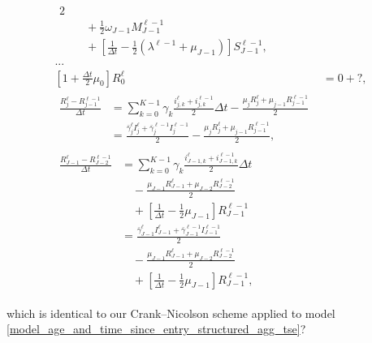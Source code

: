 \documentclass{jpmarticle}
\let\subequationsorig\subequations%
\let\endsubequationsorig\endsubequations%
\renewenvironment{subequations}{
  \subequationsorig
  \renewcommand{\theequation}{\theparentequation.\arabic{equation}}
}{
  \endsubequationsorig
}
\begin{document}
\begin{subequations}
\begin{align}
\begin{split}
      {2}
      \\ & \quad {}
      + \frac{1}{2} \omega_{J - 1} M_{J - 1}^{\ell - 1}
      \\ & \quad {}
      + \left[\frac{1}{\Delta t}
        - \frac{1}{2} (\lambda^{\ell - 1} + \mu_{J - 1})\right]
      S_{J - 1}^{\ell - 1},
    \end{split}
    \\
    ...
    \\
    \left[1 + \frac{\Delta t}{2} \mu_0\right] R_0^{\ell}
    &= 0 + ?,
    \\
    \begin{split}
      \frac{R_j^{\ell} - R_{j - 1}^{\ell - 1}}{\Delta t}
      &= \sum_{k = 0}^{K - 1} \gamma_k
      \frac{i_{j, k}^{\ell} + i_{j, k}^{\ell - 1}}
      {2}
      \Delta t
      - \frac{\mu_j R_j^{\ell}
        + \mu_{j - 1} R_{j - 1}^{\ell - 1}}
      {2}
      \\
      &= \frac{\bar{\gamma}_j^{\ell} I_j^{\ell}
        + \bar{\gamma}_j^{\ell - 1} I_j^{\ell - 1}}
      {2}
      - \frac{\mu_j R_j^{\ell}
        + \mu_{j - 1} R_{j - 1}^{\ell - 1}}
      {2},
    \end{split}
    \\
    \begin{split}
      \frac{R_{J - 1}^{\ell} - R_{J - 2}^{\ell - 1}}{\Delta t}
      &= \sum_{k = 0}^{K - 1} \gamma_k
      \frac{i_{J - 1, k}^{\ell} + i_{J - 1, k}^{\ell - 1}}
      {2}
      \Delta t
      \\ & \quad {}
      - \frac{\mu_{J - 1} R_{J - 1}^{\ell}
        + \mu_{J - 2} R_{J - 2}^{\ell - 1}}
      {2}
      \\ & \quad {}
      + \left[
        \frac{1}{\Delta t}
        - \frac{1}{2} \mu_{J - 1}
      \right] R_{J - 1}^{\ell - 1}
      \\
      &= \frac{\bar{\gamma}_{J - 1}^{\ell} I_{J - 1}^{\ell}
        + \bar{\gamma}_{J - 1}^{\ell - 1} I_{J - 1}^{\ell - 1}}
      {2}
      \\ & \quad {}
      - \frac{\mu_{J - 1} R_{J - 1}^{\ell}
        + \mu_{J - 2} R_{J - 2}^{\ell - 1}}
      {2}
      \\ & \quad {}
      + \left[
        \frac{1}{\Delta t}
        - \frac{1}{2} \mu_{J - 1}
      \right] R_{J - 1}^{\ell - 1},
    \end{split}
  \end{align}
\end{subequations}
which is identical to our Crank--Nicolson scheme applied to model
\eqref{model_age_and_time_since_entry_structured_agg_tse}?
\end{document}
